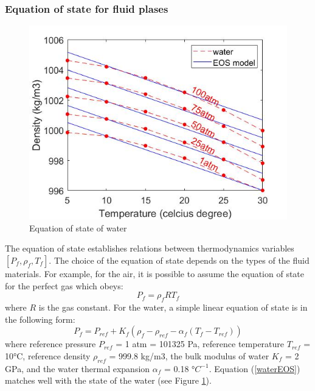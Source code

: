 \documentclass[preprint,12pt]{elsarticle}
\begin{document}
\subsubsection{Equation of state for fluid plases}
%
%
\begin{figure}[H]
\center
\includegraphics[scale=.5]{water1.jpg}
\caption{Equation of state of water}
\label{fig:water1}
\end {figure}
%
%
The equation of state establishes relations between thermodynamics variables $[P_f, \rho_f, T_f]$. The choice of the equation of state depends on the types of the fluid materials. For example, for the air, it is possible to assume the equation of state for the perfect gas which obeys:
%
%
\begin{equation}
    P_f = \rho_f R T_f
\end {equation}
%
%
where $R$ is the gas constant. For the water, a simple linear equation of state is in the following form:
%
%
\begin{equation}
    P_f = P_{ref} + K_f (\rho_f - \rho_{ref} - \alpha_f(T_f - T_{ref}))
\label{waterEOS}
\end {equation}
%
%
where reference pressure $P_{ref}$ = 1 atm = 101325 Pa, reference temperature $T_{ref}$ = 10°C, reference density  $\rho_{ref}$ = 999.8 kg/m3, the bulk modulus of water $K_f$ = 2 GPa, and the water thermal expansion $\alpha_f$ = 0.18 °$C^{-1}$. Equation (\ref{waterEOS}) matches well with the state of the water (see Figure \ref{fig:water1}).

\end{document}
